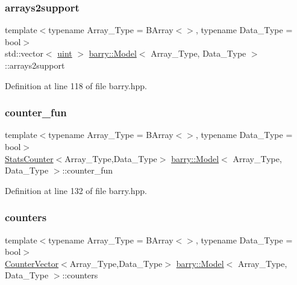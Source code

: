 \subsubsection{\texorpdfstring{arrays2support}{arrays2support}}
{\footnotesize\ttfamily template$<$typename Array\+\_\+\+Type  = B\+Array$<$$>$, typename Data\+\_\+\+Type  = bool$>$ \\
std\+::vector$<$ \hyperlink{namespacebarry_a11dfc53ddb4672278319aa04f1e09a6c}{uint} $>$ \hyperlink{classbarry_1_1_model}{barry\+::\+Model}$<$ Array\+\_\+\+Type, Data\+\_\+\+Type $>$\+::arrays2support}



Definition at line 118 of file barry.\+hpp.

\mbox{\label{classbarry_1_1_model_a1c848eda59386aaa81346cff9565268b}} 
\subsubsection{\texorpdfstring{counter\+\_\+fun}{counter\_fun}}
{\footnotesize\ttfamily template$<$typename Array\+\_\+\+Type  = B\+Array$<$$>$, typename Data\+\_\+\+Type  = bool$>$ \\
\hyperlink{classbarry_1_1_stats_counter}{Stats\+Counter}$<$Array\+\_\+\+Type,Data\+\_\+\+Type$>$ \hyperlink{classbarry_1_1_model}{barry\+::\+Model}$<$ Array\+\_\+\+Type, Data\+\_\+\+Type $>$\+::counter\+\_\+fun}



Definition at line 132 of file barry.\+hpp.

\mbox{\label{classbarry_1_1_model_a8d045fb12c7340681c942d2aade3d088}} 
\subsubsection{\texorpdfstring{counters}{counters}}
{\footnotesize\ttfamily template$<$typename Array\+\_\+\+Type  = B\+Array$<$$>$, typename Data\+\_\+\+Type  = bool$>$ \\
\hyperlink{classbarry_1_1_counter_vector}{Counter\+Vector}$<$Array\+\_\+\+Type,Data\+\_\+\+Type$>$ \hyperlink{classbarry_1_1_model}{barry\+::\+Model}$<$ Array\+\_\+\+Type, Data\+\_\+\+Type $>$\+::counters}



